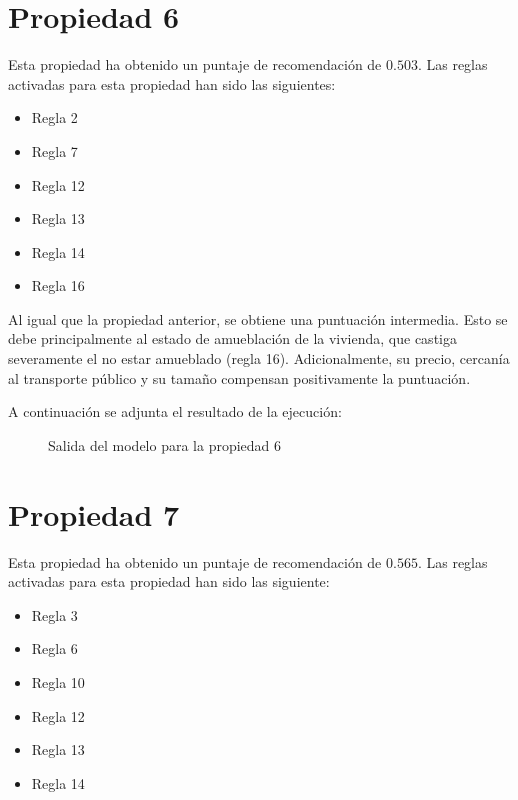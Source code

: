 \documentclass[12pt]{report} %
\begin{document}
    \section{Propiedad 6}
    Esta propiedad ha obtenido un puntaje de recomendación de $0.503$. Las
    reglas activadas para esta propiedad han sido las siguientes: 
    \begin{itemize}
        \item Regla 2
        \item Regla 7
        \item Regla 12
        \item Regla 13
        \item Regla 14
        \item Regla 16
    \end{itemize}

    Al igual que la propiedad anterior, se obtiene una puntuación intermedia.
    Esto se debe principalmente al estado de amueblación de la vivienda, que
    castiga severamente el no estar amueblado (regla 16). Adicionalmente, su
    precio, cercanía al transporte público y su tamaño compensan positivamente
    la puntuación.

    A continuación se adjunta el resultado de la ejecución:
    \begin{figure}[H]
        \centering
        \caption{Salida del modelo para la propiedad 6}
    \end{figure}

    \section{Propiedad 7}
    Esta propiedad ha obtenido un puntaje de recomendación de $0.565$. Las
    reglas activadas para esta propiedad han sido las siguiente:
    \begin{itemize}
        \item Regla 3
        \item Regla 6
        \item Regla 10
        \item Regla 12
        \item Regla 13
        \item Regla 14
    \end{itemize}
\end{document}
